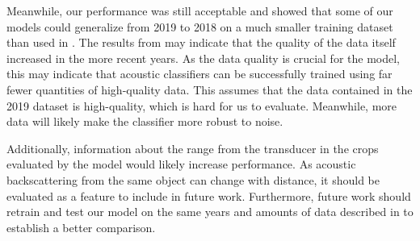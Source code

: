     Meanwhile, our performance was still acceptable and showed that some of our models could generalize from 2019 to 2018 on a much smaller training dataset than used in \citeauthor{brautaset2020acoustic}. The results from \citeauthor{brautaset2020acoustic} may indicate that the quality of the data itself increased in the more recent years. As the data quality is crucial for the model, this may indicate that acoustic classifiers can be successfully trained using far fewer quantities of high-quality data. This assumes that the data contained in the 2019 dataset is high-quality, which is hard for us to evaluate. Meanwhile, more data will likely make the classifier more robust to noise. 
    
    Additionally, information about the range from the transducer in the crops evaluated by the model would likely increase performance. As acoustic backscattering from the same object can change with distance, it should be evaluated as a feature to include in future work. Furthermore, future work should retrain and test our model on the same years and amounts of data described in \citeauthor{brautaset2020acoustic} to establish a better comparison.  

